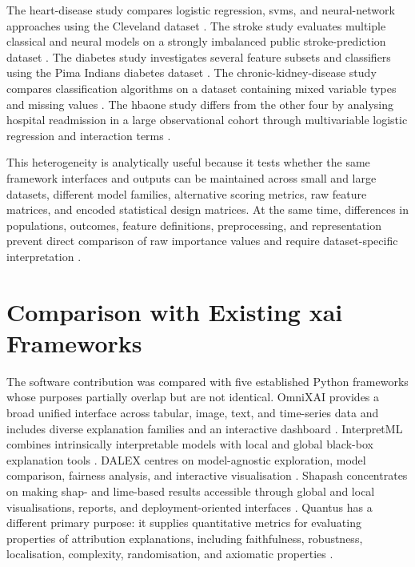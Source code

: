 The heart-disease study compares logistic regression, \glspl{svm}, and neural-network approaches using the Cleveland dataset \citep{khanna_comparative_2015}. The stroke study evaluates multiple classical and neural models on a strongly imbalanced public stroke-prediction dataset \citep{wu_machine_2024}. The diabetes study investigates several feature subsets and classifiers using the Pima Indians diabetes dataset \citep{chang_pima_2023}. The chronic-kidney-disease study compares classification algorithms on a dataset containing mixed variable types and missing values \citep{santhiya_chronic_2024}. The \gls{hbaone} study differs from the other four by analysing hospital readmission in a large observational cohort through multivariable logistic regression and interaction terms \citep{strack_impact_2014}.

This heterogeneity is analytically useful because it tests whether the same framework interfaces and outputs can be maintained across small and large datasets, different model families, alternative scoring metrics, raw feature matrices, and encoded statistical design matrices. At the same time, differences in populations, outcomes, feature definitions, preprocessing, and representation prevent direct comparison of raw importance values and require dataset-specific interpretation \citep{vilone_classification_2021, mohseni_multidisciplinary_2021, moons_probastai_2025}.

\section{Comparison with Existing \gls{xai} Frameworks}

The software contribution was compared with five established Python frameworks whose purposes partially overlap but are not identical. OmniXAI provides a broad unified interface across tabular, image, text, and time-series data and includes diverse explanation families and an interactive dashboard \citep{wang_omnixai_2022}. InterpretML combines intrinsically interpretable models with local and global black-box explanation tools \citep{nori_interpretml_2019}. DALEX centres on model-agnostic exploration, model comparison, fairness analysis, and interactive visualisation \citep{baniecki_dalex_2021}. Shapash concentrates on making \gls{shap}- and \gls{lime}-based results accessible through global and local visualisations, reports, and deployment-oriented interfaces \citep{maif_shapash_2026}. Quantus has a different primary purpose: it supplies quantitative metrics for evaluating properties of attribution explanations, including faithfulness, robustness, localisation, complexity, randomisation, and axiomatic properties \citep{hedstrom_quantus_2023}.

